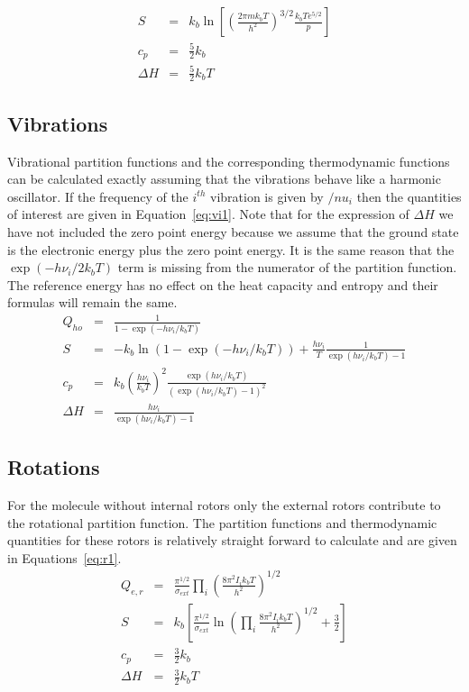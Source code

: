\documentclass[a4paper,12pt]{article}
\begin{document}
\begin{eqnarray}
 S%
&=&k_b \ln\left[\left(\frac{2\pi m k_bT}{h^2}\right)^{3/2} \frac{k_bTe^{5/2}}{p}\right]\nonumber\\
c_p&=& \frac{5}{2}k_b \nonumber \\
\Delta H&=& \frac{5}{2}k_bT
\label{eq:tr2}
\end{eqnarray}

\subsection{Vibrations}
Vibrational partition functions and the corresponding thermodynamic functions can be calculated exactly assuming that the vibrations behave like a harmonic oscillator. If the frequency of the $i^{th}$ vibration is given by $/nu_i$ then the quantities of interest are given in Equation~\ref{eq:vi1}. Note that for the expression of $\Delta H$ we have not included the zero point energy because we assume that the ground state is the electronic energy plus the zero point energy. It is the same reason that the $\exp{(-h\nu_i/2k_bT)}$ term is missing from the numerator of the partition function. The reference energy has no effect on the heat capacity and entropy and their formulas will remain the same.
\begin{eqnarray}
Q_{ho} &=& \frac{1}{1-\exp{(-h\nu_i/k_bT)}} \nonumber \\
S &=& -k_b \ln\left(1-\exp{(-h\nu_i/k_bT)}\right)+\frac{h\nu_i}{T}\frac{1}{\exp{(h\nu_i/k_bT)}-1}\nonumber \\
c_p &=& k_b\left(\frac{h\nu_i}{k_bT}\right)^2 \frac{\exp{(h\nu_i/k_bT)}}{\left(\exp{(h\nu_i/k_bT)}-1\right)^2}\nonumber \\
\Delta H &=& \frac{h\nu_i}{\exp{(h\nu_i/k_bT)}-1}
\label{eq:vi1}
\end{eqnarray}

\subsection{Rotations}
For the molecule without internal rotors only the external rotors contribute to the rotational partition function. The partition functions and thermodynamic quantities for these rotors is relatively straight forward to calculate and are given in Equations~\ref{eq:r1}.
\begin{eqnarray}
 Q_{e,r}&=&\frac{\pi^{1/2}}{\sigma_{ext}}\prod_i \left(\frac{8\pi^2I_ik_bT}{ h^2}\right)^{1/2} \nonumber \\
S&=& k_b \left[\frac{\pi^{1/2}}{\sigma_{ext}} \ln \left(\prod_i \frac{8\pi^2I_ik_bT}{h^2}\right)^{1/2} +\frac{3}{2}\right] \nonumber \\
c_p&=& \frac{3}{2}k_b\nonumber \\
\Delta H &=& \frac{3}{2}k_bT
\label{eq:r1}
\end{eqnarray}
\end{document}
